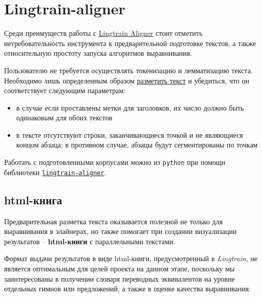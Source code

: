 \documentclass[
  letterpaper,
]{book}
\providecommand{\tightlist}{%
  \setlength{\itemsep}{0pt}\setlength{\parskip}{0pt}}\usepackage{longtable,booktabs,array}
\begin{document}

\hypertarget{sec-lingtrain}{%
\section{Lingtrain-aligner}\label{sec-lingtrain}}

Среди преимуществ работы с
\href{https://github.com/averkij/lingtrain-aligner}{Lingtrain Aligner}
стоит отметить нетребовательность инструмента к предварительной
подготовке текстов, а также относительную простоту запуска алгоритмов
выравнивания.

Пользователю не требуется осуществлять токенизацию и лемматизацию
текста. Необходимо лишь определенным образом
\href{https://habr.com/ru/articles/590549/}{разметить текст} и
убедиться, что он соответствует следующим параметрам:

\begin{itemize}
\tightlist
\item
  в случае если проставлены метки для заголовков, их число должно быть
  одинаковым для обоих текстов
\item
  в тексте отсутствуют строки, заканчивающиеся точкой и не являющиеся
  концом абзаца; в противном случае, абзацы будут сегментированы по
  точкам
\end{itemize}

Работать с подготовленными корпусами можно из \texttt{python} при помощи
библиотеки
\href{https://pypi.org/project/lingtrain-aligner/}{\texttt{lingtrain-aligner}}.

\hypertarget{html-ux43aux43dux438ux433ux430}{%
\subsection{html-книга}\label{html-ux43aux43dux438ux433ux430}}

Предварительная разметка текста оказывается полезной не только для
выравнивания в элайнерах, но также помогает при создании визуализации
результатов -- \textbf{html-книги} с параллельными текстами.

Формат выдачи результатов в виде html-книги, предусмотренный в
\emph{Lingtrain}, не является оптимальным для целей проекта на данном
этапе, поскольку мы заинтересованы в получении словаря переводных
эквивалентов на уровне отдельных гимнов или предложений, а также в
оценке качества выравнивания.
\end{document}
